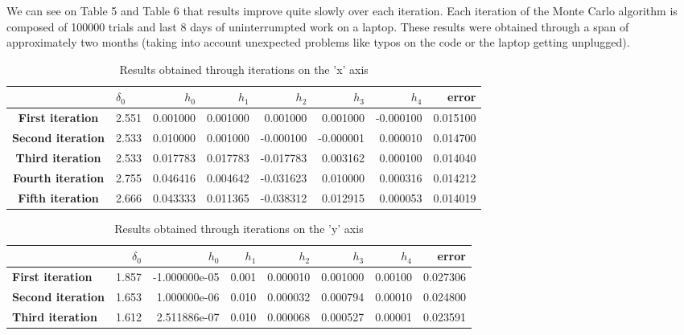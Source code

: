 \documentclass[openany]{article}
\begin{document}
We can see on Table 5 and Table 6 that results improve quite slowly over each iteration. Each iteration of the Monte Carlo algorithm is composed of 100000 trials and last 8 days of uninterrumpted work on a laptop. These results were obtained through a span of approximately two months (taking into account unexpected problems like typos on the code or the laptop getting unplugged).  



\begin{table}[!h]
    \centering
\begin{tabular}{clrrrrrr}
& \(\delta_0\) &     \(h_0\) &         \(h_1\)  &         \(h_2\)  &         \(h_3\)  &         \(h_4\) & error \\
\hline 
\textbf{First iteration}  &  2.551 &  0.001000 &  0.001000 &  0.001000 &  0.001000 & -0.000100 &  0.015100 \\
\textbf{Second iteration} &  2.533 &  0.010000 &  0.001000 & -0.000100 & -0.000001 &  0.000010 &  0.014700 \\
\textbf{Third iteration}  &  2.533 &  0.017783 &  0.017783 & -0.017783 &  0.003162 &  0.000100 &  0.014040 \\
\textbf{Fourth iteration} &  2.755 &  0.046416 &  0.004642 & -0.031623 &  0.010000 &  0.000316 &  0.014212 \\
\textbf{Fifth iteration} &  2.666 &  0.043333 &  0.011365 & -0.038312 &  0.012915 &  0.000053 &  0.014019 \\

    \end{tabular}
    \caption{Results obtained through iterations on the 'x' axis}
    \label{tab:my_label}
\end{table}
 

\begin{table}[!h]
    \centering

\begin{tabular}{lrrrrrrr}
\toprule
& \(\delta_0\) &     \(h_0\) &         \(h_1\)  &         \(h_2\)  &         \(h_3\)  &         \(h_4\) & error \\
\midrule
\hline
\textbf{First iteration}  &  1.857 & -1.000000e-05 &  0.001 &  0.000010 &  0.001000 &  0.00100 &  0.027306 \\
\textbf{Second iteration}  &  1.653 &  1.000000e-06 &  0.010 &  0.000032 &  0.000794 &  0.00010 &  0.024800 \\
\textbf{Third iteration}   &  1.612 &  2.511886e-07 &  0.010 &  0.000068 &  0.000527 &  0.00001 &  0.023591 \\
\bottomrule
\end{tabular}
    \caption{Results obtained through iterations on the 'y' axis}
    \label{tab:my_label}
\end{table}
\end{document}
